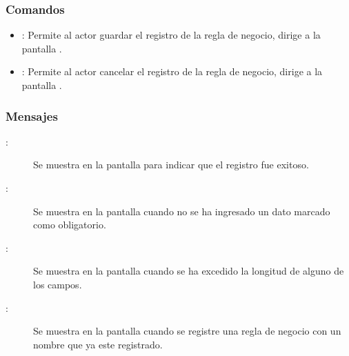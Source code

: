 \subsubsection{Comandos}
\begin{itemize}
	\item {}: Permite al actor guardar el registro de la regla de negocio, dirige a la pantalla .
	\item {}: Permite al actor cancelar el registro de la regla de negocio, dirige a la pantalla .
\end{itemize}

\subsubsection{Mensajes}
	
\begin{description}
	\item[:] Se muestra en la pantalla  para indicar que el registro fue exitoso.
	\item[:] Se muestra en la pantalla  cuando no se ha ingresado un dato marcado como obligatorio.
	\item[:] Se muestra en la pantalla  cuando se ha excedido la longitud de alguno de los campos.
	\item[:] Se muestra en la pantalla  cuando se registre una regla de negocio con un nombre que ya este registrado.
\end{description}
